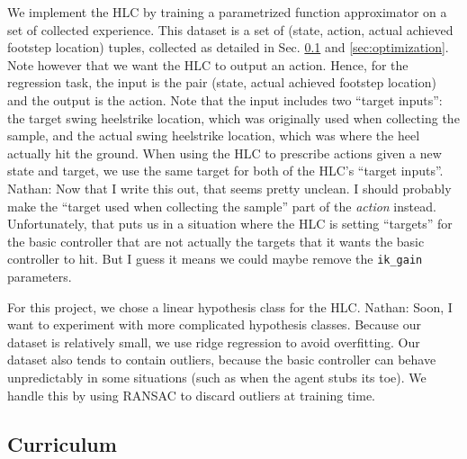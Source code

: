 \documentclass[a4paper]{article}
\newcommand{\nhatch}[1]{{\leavevmode\color{blue} Nathan: #1}}
\begin{document}
We implement the HLC by training a parametrized function approximator on a set of collected experience.
This dataset is a set of (state, action, actual achieved footstep location) tuples, collected as detailed in Sec. \ref{sec:curriculum} and \ref{sec:optimization}.
Note however that we want the HLC to output an action.
Hence, for the regression task, the input is the pair (state, actual achieved footstep location) and the output is the action.
Note that the input includes two ``target inputs'': the target swing heelstrike location, which was originally used when collecting the sample, and the actual swing heelstrike location, which was where the heel actually hit the ground.
When using the HLC to prescribe actions given a new state and target, we use the same target for both of the HLC's ``target inputs''.
\nhatch{Now that I write this out, that seems pretty unclean. I should probably make the ``target used when collecting the sample'' part of the \emph{action} instead. Unfortunately, that puts us in a situation where the HLC is setting ``targets'' for the basic controller that are not actually the targets that it wants the basic controller to hit. But I guess it means we could maybe remove the \texttt{ik\_gain} parameters.}

For this project, we chose a linear hypothesis class for the HLC.
\nhatch{Soon, I want to experiment with more complicated hypothesis classes.}
Because our dataset is relatively small, we use ridge regression to avoid overfitting.
Our dataset also tends to contain outliers, because the basic controller can behave unpredictably in some situations (such as when the agent stubs its toe).
We handle this by using RANSAC \citep{fischler1981random} to discard outliers at training time.

\subsection{Curriculum} \label{sec:curriculum}
\end{document}
